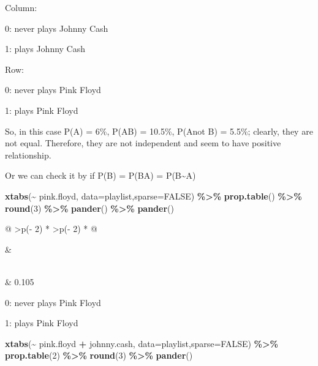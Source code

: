 \documentclass[
]{article}
\newenvironment{Shaded}{\begin{snugshade}}{\end{snugshade}}
\newcommand{\AttributeTok}[1]{\textcolor[rgb]{0.13,0.29,0.53}{#1}}
\newcommand{\ConstantTok}[1]{\textcolor[rgb]{0.56,0.35,0.01}{#1}}
\newcommand{\DecValTok}[1]{\textcolor[rgb]{0.00,0.00,0.81}{#1}}
\newcommand{\FunctionTok}[1]{\textcolor[rgb]{0.13,0.29,0.53}{\textbf{#1}}}
\newcommand{\NormalTok}[1]{#1}
\newcommand{\SpecialCharTok}[1]{\textcolor[rgb]{0.81,0.36,0.00}{\textbf{#1}}}
\begin{document}
Column:

0: never plays Johnny Cash

1: plays Johnny Cash

Row:

0: never plays Pink Floyd

1: plays Pink Floyd

So, in this case P(A) = 6\%, P(A\textbar B) = 10.5\%, P(A\textbar not B) = 5.5\%; clearly, they are not equal. Therefore, they are not independent and seem to have positive relationship.

Or we can check it by if P(B) = P(B\textbar A) = P(B\textbar\textasciitilde A)

\begin{Shaded}
\begin{Highlighting}[]
\FunctionTok{xtabs}\NormalTok{(}\SpecialCharTok{\textasciitilde{}}\NormalTok{ pink.floyd, }\AttributeTok{data=}\NormalTok{playlist,}\AttributeTok{sparse=}\ConstantTok{FALSE}\NormalTok{) }\SpecialCharTok{\%\textgreater{}\%} \FunctionTok{prop.table}\NormalTok{() }\SpecialCharTok{\%\textgreater{}\%} \FunctionTok{round}\NormalTok{(}\DecValTok{3}\NormalTok{) }\SpecialCharTok{\%\textgreater{}\%} \FunctionTok{pander}\NormalTok{() }\SpecialCharTok{\%\textgreater{}\%} \FunctionTok{pander}\NormalTok{()}
\end{Highlighting}
\end{Shaded}

\begin{longtable}[]{@{}
  >{\centering\arraybackslash}p{(\columnwidth - 2\tabcolsep) * }
  >{\centering\arraybackslash}p{(\columnwidth - 2\tabcolsep) * }@{}}
\toprule\noalign{}
\begin{minipage}[b]{\linewidth}
\end{minipage} & \begin{minipage}[b]{\linewidth}
\end{minipage} \\
\midrule\noalign{}
\endhead
\bottomrule\noalign{}
 & 0.105 \\
\end{longtable}

0: never plays Pink Floyd

1: plays Pink Floyd

\begin{Shaded}
\begin{Highlighting}[]
\FunctionTok{xtabs}\NormalTok{(}\SpecialCharTok{\textasciitilde{}}\NormalTok{ pink.floyd }\SpecialCharTok{+}\NormalTok{ johnny.cash, }\AttributeTok{data=}\NormalTok{playlist,}\AttributeTok{sparse=}\ConstantTok{FALSE}\NormalTok{) }\SpecialCharTok{\%\textgreater{}\%} \FunctionTok{prop.table}\NormalTok{(}\DecValTok{2}\NormalTok{) }\SpecialCharTok{\%\textgreater{}\%} \FunctionTok{round}\NormalTok{(}\DecValTok{3}\NormalTok{) }\SpecialCharTok{\%\textgreater{}\%} \FunctionTok{pander}\NormalTok{()}
\end{Highlighting}
\end{Shaded}
\end{document}
